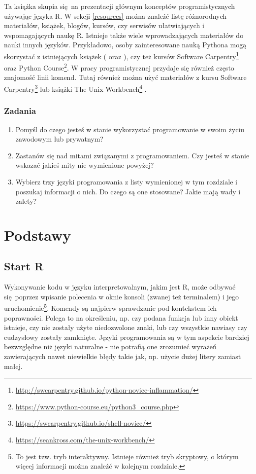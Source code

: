 \documentclass[paper=6in:9in,pagesize=pdftex,headinclude=on,footinclude=on,10pt]{scrbook}
\DeclareRobustCommand{\href}[2]{#2\footnote{\url{#1}}}
\providecommand{\tightlist}{%
  \setlength{\itemsep}{0pt}\setlength{\parskip}{0pt}}
\begin{document}
Ta książka skupia się~na prezentacji głównym konceptów programistycznych używając języka R.
W sekcji \ref{resources} można znaleźć listę różnorodnych materiałów, książek, blogów, kursów, czy serwisów ułatwiających i wspomagających naukę R.
Istnieje także wiele wprowadzających materiałów do nauki innych języków.
Przykładowo, osoby zainteresowane nauką Pythona mogą skorzystać z istniejących książek (\citet{gries2017practical} oraz \citet{guzdial2016introduction}), czy też kursów \href{http://swcarpentry.github.io/python-novice-inflammation/}{Software Carpentry} oraz \href{https://www.python-course.eu/python3_course.php}{Python Course}.
W pracy programistycznej przydaje się również często znajomość linii komend.
Tutaj również można użyć materiałów z kursu \href{https://swcarpentry.github.io/shell-novice/}{Software Carpentry} lub książki \href{https://seankross.com/the-unix-workbench/}{The Unix Workbench} \citep{krossUnixWorkbench2017}.

\hypertarget{zadania}{%
\section{Zadania}\label{zadania}}

\begin{enumerate}
\def\labelenumi{\arabic{enumi})}
\tightlist
\item
  Pomyśl do czego jesteś w stanie wykorzystać programowanie w swoim życiu zawodowym lub prywatnym?
\item
  Zastanów się nad mitami związanymi z programowaniem.
  Czy jesteś w stanie wskazać jakieś mity nie wymienione powyżej?
\item
  Wybierz trzy języki programowania z listy wymienionej w tym rozdziale i poszukaj informacji o nich.
  Do czego są one stosowane?
  Jakie mają wady i zalety?
\end{enumerate}

\hypertarget{part-podstawy}{%
\part{Podstawy}\label{part-podstawy}}

\hypertarget{ergosum}{%
\chapter{Start R}\label{ergosum}}

Wykonywanie kodu w języku interpretowalnym, jakim jest R, może odbywać się~poprzez wpisanie polecenia w oknie konsoli (zwanej też terminalem) i jego uruchomienie\footnote{To jest tzw. tryb interaktywny.
  Istnieje również tryb skryptowy, o którym więcej informacji można znaleźć w kolejnym rozdziale.}.
Komendy są najpierw sprawdzanie pod kontekstem ich poprawności.
Polega to na określeniu, np. czy podana funkcja lub inny obiekt istnieje, czy nie zostały użyte niedozwolone znaki, lub czy wszystkie nawiasy czy cudzysłowy zostały zamknięte.
Języki programowania są w tym aspekcie bardziej bezwzględne niż języki naturalne - nie potrafią one zrozumieć wyrażeń zawierających nawet niewielkie błędy takie jak, np. użycie dużej litery zamiast małej.
\end{document}
